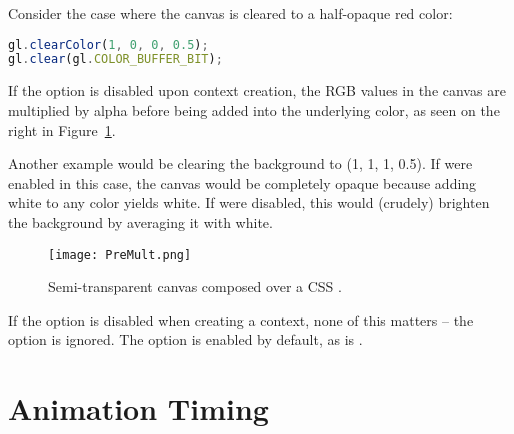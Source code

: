Consider the case where the canvas is cleared to a half-opaque red color:

\begin{lstlisting}[language=JavaScript]
gl.clearColor(1, 0, 0, 0.5);
gl.clear(gl.COLOR_BUFFER_BIT);
\end{lstlisting}

If the  option is disabled upon context creation, the RGB values in the canvas are multiplied by alpha before being added into the underlying color, as seen on the right in Figure~\ref{fig:PreMult}.

Another example would be clearing the background to (1, 1, 1, 0.5).  If  were enabled in this case, the canvas would be completely opaque because adding white to any color yields white.  If  were disabled, this would (crudely) brighten the background by averaging it with white.

\begin{figure}[htb]\centering
  \texttt{[image: PreMult.png]}
  \caption{Semi-transparent canvas composed over a CSS .}
  \label{fig:PreMult}
\end{figure}

If the  option is disabled when creating a context, none of this matters -- the  option is ignored.  The  option is enabled by default, as is .

\begin{comment}
Note that we're not addressing css-opacity.

In this book, we never add children elements to \code{<canvas>}, but there's nothing wrong with doing so.  On some platforms, this can degrade performance, although this is improving as WebGL implementations are maturing.

http://www.svgopen.org/2005/papers/abstractsvgopen/
http://stackoverflow.com/questions/9491417/when-webgl-decide-to-update-the-display?answertab=votes#tab-top

\end{comment}

\section{Animation Timing}

